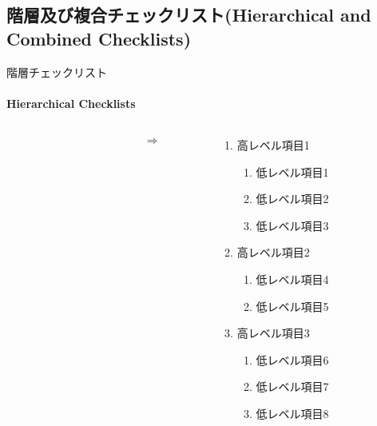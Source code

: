\subsection{階層及び複合チェックリスト(Hierarchical and Combined Checklists)}
\begin{frame}{階層チェックリスト}
\framesubtitle{Hierarchical Checklists }
\begin{columns}
    \begin{column}{0.35\textwidth}
    \end{column}
    \begin{column}{0.05\textwidth}
    \Huge\[\Rightarrow\]
    \end{column}
    \begin{column}{0.5\textwidth}
    \begin{enumerate}
    \item 高レベル項目1
        \begin{enumerate}
        \item 低レベル項目1
        \item 低レベル項目2
        \item 低レベル項目3
        \end{enumerate}
    \item 高レベル項目2
        \begin{enumerate}
        \item 低レベル項目4
        \item 低レベル項目5
        \end{enumerate}
    \item 高レベル項目3
        \begin{enumerate}
        \item 低レベル項目6
        \item 低レベル項目7
        \item 低レベル項目8
        \end{enumerate}
    \end{enumerate}
    \end{column}
\end{columns}
\end{frame}
